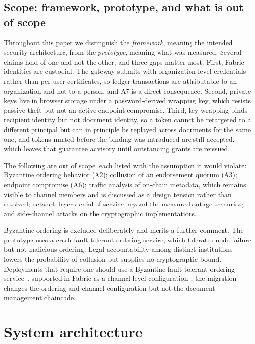 \documentclass[preprint,12pt]{elsarticle}
\begin{document}
\subsection{Scope: framework, prototype, and what is out of scope}
\label{sec:scope}

Throughout this paper we distinguish the \emph{framework}, meaning the
intended security architecture, from the \emph{prototype}, meaning what was
measured. Several claims hold of one and not the other, and three gaps
matter most. First, Fabric identities
are custodial. The gateway submits with organization-level credentials rather
than per-user certificates, so ledger transactions are attributable to an
organization and not to a person, and A7 is a direct consequence. Second,
private keys live in browser storage under a password-derived wrapping key,
which resists passive theft but not an active endpoint compromise. Third, key
wrapping binds recipient identity but not document identity, so a token cannot
be retargeted to a different principal but can in principle be replayed across
documents for the same one, and tokens minted before the binding was introduced
are still accepted, which leaves that guarantee advisory until outstanding
grants are reissued.

The following are out of scope, each listed with the assumption it would
violate: Byzantine ordering behavior (A2); collusion of an endorsement quorum
(A3); endpoint compromise (A6); traffic analysis of on-chain metadata, which
remains visible to channel members and is discussed as a design tension rather
than resolved; network-layer denial of service beyond the measured outage
scenarios; and side-channel attacks on the cryptographic implementations.

Byzantine ordering is excluded deliberately and merits a further comment.
The prototype uses a crash-fault-tolerant ordering
service, which tolerates node failure but not malicious ordering. Legal
accountability among distinct institutions lowers the probability of collusion
but supplies no cryptographic bound. Deployments that require one should use a
Byzantine-fault-tolerant ordering
service~\cite{castro1999pbft,stathakopoulou2022smartbft}, supported in Fabric
as a channel-level configuration~\cite{fabricBFTConfigurationDoc}; the
migration changes the ordering and channel configuration but not the
document-management chaincode.


\section{System architecture}
\label{sec:architecture}
\end{document}
